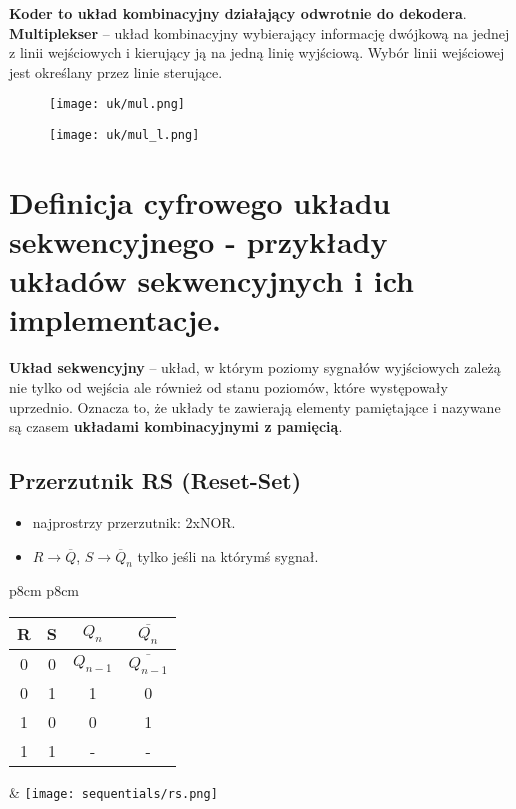 \documentclass[main.tex]{subfiles}
\begin{document}
    \textbf{Koder to układ kombinacyjny działający odwrotnie do dekodera}.
    \hfill \\

    \noindent \textbf{Multiplekser} -- układ kombinacyjny wybierający informację dwójkową na jednej z linii wejściowych i kierujący
    ją na jedną linię wyjściową. Wybór linii wejściowej jest określany przez linie sterujące.

    \begin{figure}[H]
        \texttt{[image: uk/mul.png]}
    \end{figure}

    \begin{figure}[H]
        \texttt{[image: uk/mul\_l.png]}
    \end{figure}


    \section{Definicja cyfrowego układu sekwencyjnego - przykłady układów sekwencyjnych i ich implementacje.}

    \textbf{Układ sekwencyjny} -- układ, w którym poziomy sygnałów wyjściowych zależą nie tylko od wejścia
    ale również od stanu poziomów, które występowały uprzednio.
    Oznacza to, że układy te zawierają elementy pamiętające i nazywane są czasem \textbf{układami kombinacyjnymi z pamięcią}.

    \subsection{Przerzutnik RS (Reset-Set)}
    \begin{itemize}[noitemsep]
        \item najprostrzy przerzutnik: 2xNOR.
        \item $R \rightarrow \overline{Q}$, $S \rightarrow \overline Q_n$ tylko jeśli na którymś sygnał.
    \end{itemize}

    \begin{table}[H]
        \center
        \begin{tabular}{p{8cm} p{8cm}}
            \begin{tabular}{|c|c|c|c|}
                \hline
                \textbf{R} & \textbf{S} & $Q_n$ & $\overline{Q_n}$ \\ \hline \hline
                0 & 0 & $Q_{n-1}$ & $\overline{Q_{n-1}}$            \\ \hline
                0 & 1 & 1 & 0              \\ \hline
                1 & 0 & 0 & 1              \\ \hline
                1 & 1 & - & -              \\ \hline
            \end{tabular}
            &
            \texttt{[image: sequentials/rs.png]}
        \end{tabular}
    \end{table}
\end{document}
